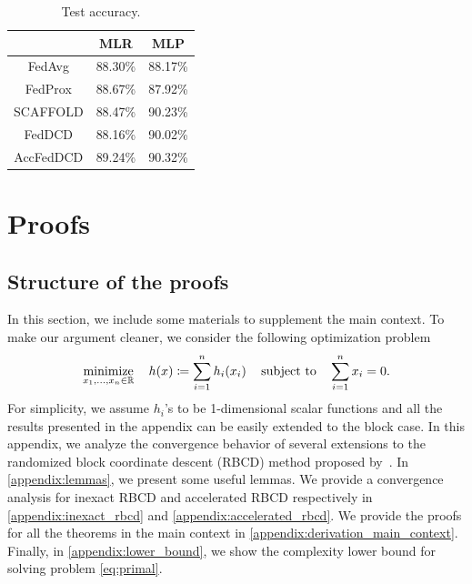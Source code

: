\begin{table}[t]
    \centering
    \begin{tabular}{ccc}
    \toprule
                    &  MLR      & MLP \\ \hline
        FedAvg      &  88.30\%  & 88.17\% \\
        FedProx     &  88.67\%  & 87.92\% \\ 
        SCAFFOLD    &  88.47\%  & 90.23\% \\
        FedDCD      &  88.16\%  & 90.02\% \\
        AccFedDCD   &  89.24\%  & 90.32\% \\
    \bottomrule
    \end{tabular}
    \caption{Test accuracy.}
    \label{tab:exp3}
\end{table}





\section{Proofs}

\subsection{Structure of the proofs}

In this section, we include some materials to supplement the main context. To make our argument cleaner, we consider the following optimization problem 
\begin{align}
    \displaystyle\mathop{\hbox{\rm minimize}}_{x_1, \dots, x_n \in \mathbb{R}}\enspace\enspace h(x) \coloneqq \sum_{i=1}^n h_i(x_i) \enspace\enspace\mathop{\hbox{\rm subject to}}\enspace\enspace \sum_{i=1}^n x_i = 0 \label{eq:CDObj}.
\end{align}
For simplicity, we assume $h_i$'s to be 1-dimensional scalar functions and all the results presented in the appendix can be easily extended to the block case. In this appendix, we analyze the convergence behavior of several extensions to the randomized block coordinate descent (RBCD) method proposed by~\citet{necoara2017random}. In \autoref{appendix:lemmas}, we present some useful lemmas. We provide a convergence analysis for inexact RBCD and accelerated RBCD respectively in \autoref{appendix:inexact_rbcd} and \autoref{appendix:accelerated_rbcd}. We provide the proofs for all the theorems in the main context in \autoref{appendix:derivation_main_context}. Finally, in \autoref{appendix:lower_bound}, we show the complexity lower bound for solving problem \eqref{eq:primal}. 


